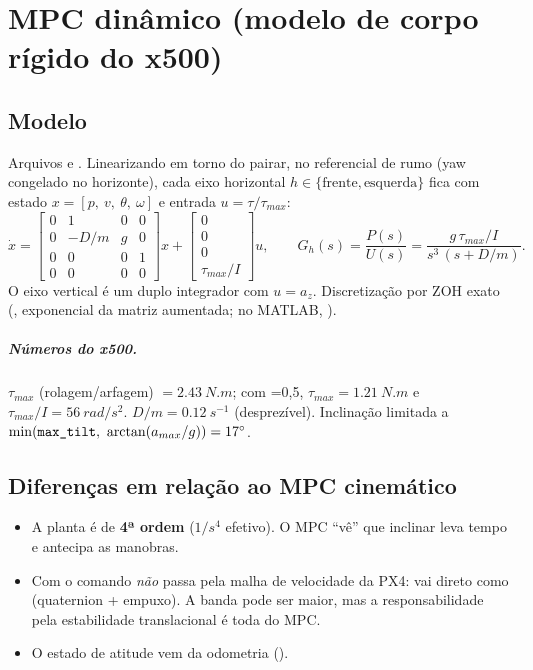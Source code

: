 \chapter{MPC dinâmico (modelo de corpo rígido do x500)}
\label{cap:mpcdin}

\section{Modelo}
Arquivos  e .
Linearizando em torno do pairar, no referencial de rumo (yaw congelado no horizonte), cada
eixo horizontal $h\in\{\text{frente},\text{esquerda}\}$ fica com estado
$x=[p,\ v,\ \theta,\ \omega]$ e entrada $u=\tau/\tau_{max}$:
\begin{equation}
  \dot x =
  \begin{bmatrix}
    0&1&0&0\\
    0&-D/m&g&0\\
    0&0&0&1\\
    0&0&0&0
  \end{bmatrix}x+
  \begin{bmatrix}0\\0\\0\\ \tau_{max}/I\end{bmatrix}u,
  \qquad
  G_h(s)=\frac{P(s)}{U(s)} = \frac{g\,\tau_{max}/I}{s^3\,(s+D/m)} .
\end{equation}
O eixo vertical é um duplo integrador com $u=a_z$. Discretização por ZOH exato
(, exponencial da matriz aumentada; no MATLAB, ).

\paragraph{Números do x500.} $\tau_{max}$ (rolagem/arfagem) $=\SI{2,43}{N.m}$; com
=0,5, $\tau_{max}=\SI{1,21}{N.m}$ e
$\tau_{max}/I=\SI{56}{rad/s^2}$. $D/m=\SI{0,12}{s^{-1}}$ (desprezível). Inclinação
limitada a $\min(\code{max\_tilt},\ \arctan(a_{max}/g))=\ang{17}$.

\section{Diferenças em relação ao MPC cinemático}
\begin{itemize}
  \item A planta é de \textbf{4ª ordem} ($1/s^4$ efetivo). O MPC ``vê'' que inclinar
        leva tempo e antecipa as manobras.
  \item Com  o comando \emph{não} passa pela malha de velocidade
        da PX4: vai direto como  (quaternion + empuxo).
        A banda pode ser maior, mas a responsabilidade pela estabilidade translacional é
        toda do MPC.
  \item O estado de atitude vem da odometria ().
\end{itemize}

